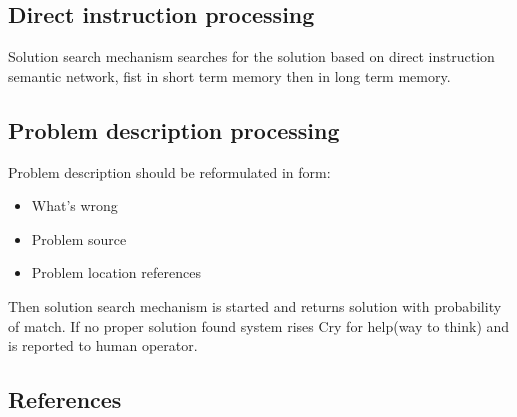 \documentclass{acm_proc_article-sp}
\begin{document}
\subsection{Direct instruction processing}

Solution search mechanism searches for the solution based on direct instruction semantic network, fist in short term memory then in long term memory.

\subsection{Problem description processing}

Problem description should be reformulated in form:
\begin{itemize}
  \item What's wrong
  \item Problem source
  \item Problem location references
\end{itemize}

Then solution search mechanism is started and returns solution with probability of match. If no proper solution found system rises Cry for help(way to think) and is reported to human operator.

\subsection{References}
\end{document}
